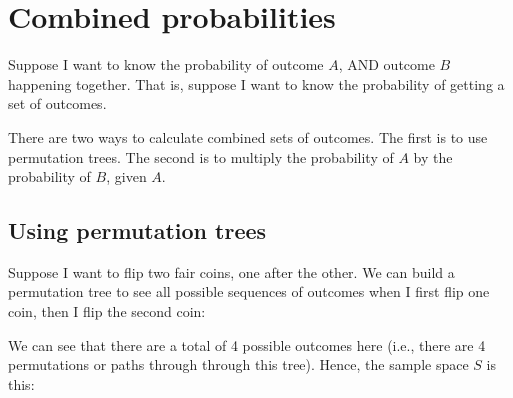 \documentclass[../../../main.tex]{subfiles}
\begin{document}
\chapter{Combined probabilities}


Suppose I want to know the probability of outcome $A$, AND outcome $B$ happening together. That is, suppose I want to know the probability of getting a  set of outcomes. 

There are two ways to calculate combined sets of outcomes. The first is to use permutation trees. The second is to multiply the probability of $A$ by the probability of $B$, given $A$.


\section{Using permutation trees}

Suppose I want to flip two fair coins, one after the other. We can build a permutation tree to see all possible sequences of outcomes when I first flip one coin, then I flip the second coin:

\begin{center}
\end{center}

\noindent
We can see that there are a total of 4 possible outcomes here (i.e., there are 4 permutations or paths through through this tree). Hence, the sample space $S$ is this:
\end{document}
